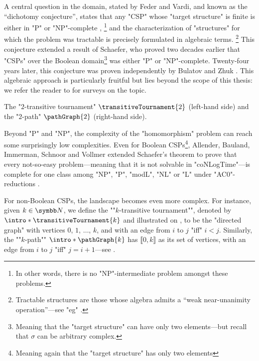 A central question in the domain, stated by Feder and Vardi,
and known as the ``dichotomy conjecture'', states that any "CSP" whose "target structure" is 
finite is either in "P" or "NP"-complete
\cite[\S~2, ``Dichotomy question'']{FederVardi1998ComputationalStructure},%
\footnote{In other words, there is no "NP"-intermediate 
problem amongst these problems.} and the characterization of "structures" for which the problem
was tractable is precisely formulated in algebraic terms.%
\footnote{Tractable structures are those whose algebra admits a
``weak near-unanimity operation''---see "eg" \cite[\S~1, p.~3]{Zhuk2020CSPDichotomy}.}
This conjecture extended a result of Schaefer, who proved two decades earlier
that "CSPs" over the Boolean domain\footnote{Meaning that the "target structure" can have only two elements---but recall that $\sigma$ can be arbitrary complex.} was either "P" or "NP"-complete.
Twenty-four years later, this conjecture was proven independently by
Bulatov \cite[Theorem 1]{Bulatov2017DichotomyCSPs}
and Zhuk \cite[Theorem 1.4]{Zhuk2020CSPDichotomy}.
This algebraic approach is particularly fruitful but lies beyond
the scope of this thesis: we refer the reader to \cite{BartoKrokhinWillard2017Polymorphisms,Larose2017DigraphCSP} for surveys on the topic.

\begin{marginfigure}
	\centering
	\begin{tikzpicture}
		
	\end{tikzpicture}
	\hspace{4em}
	\begin{tikzpicture}
		
	\end{tikzpicture}
	\caption{
		\AP\label{fig:T2-P2}
		The "$2$-transitive tournament" $\transitiveTournament{2}$
		(left-hand side) and the "$2$-path" $\pathGraph{2}$ (right-hand side).
	}
\end{marginfigure}
Beyond "P" and "NP", the complexity of the "homomorphism" problem can reach some
surprisingly low complexities.
Even for Boolean CSPs\footnote{Meaning again that the "target structure" has only two elements},
Allender, Bauland, Immerman, Schnoor and Vollmer extended Schaefer's theorem to
prove that every not-so-easy problem---meaning that it is not solvable in "coNLogTime"---is
complete for one class among "NP", "P", "modL", "NL" or "L" under "AC0"-reductions
\cite[Theorem~3.1]{AllenderBaulandImmermanSchnoorVollmer2009Schaefer}.

For non-Boolean CSPs, the landscape becomes even more complex.
For instance, given $k\in\N$, we define the \AP""$k$-transitive tournament"", denoted
by \AP$\intro*\transitiveTournament{k}$ and illustrated on ,
to be the "directed graph" with vertices $0$, $1$, $\hdots$, $k$,
and with an edge from $i$ to $j$ "iff" $i < j$.
Similarly, the \AP""$k$-path"" \AP$\intro*\pathGraph{k}$ has $\lBrack 0,k\rBrack$ as
its set of vertices, with an edge from $i$ to $j$ "iff" $j = i + 1$---see .

